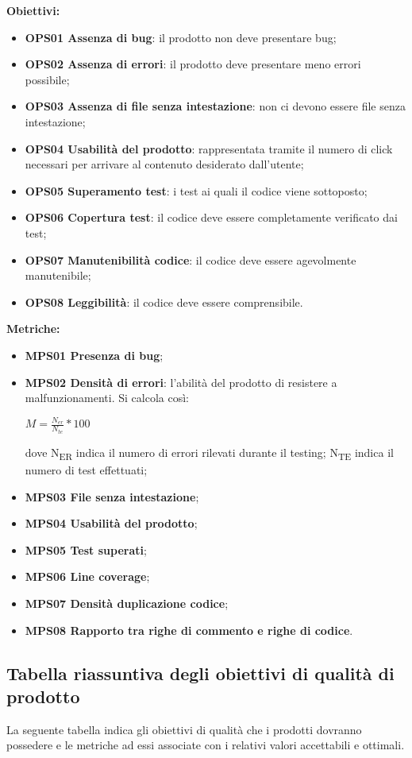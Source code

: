 \documentclass[../piano_di_qualifica.tex]{subfiles}
\begin{document}
\smallbreak
\textbf{Obiettivi:}
\smallbreak
\begin{itemize}
	\item \textbf{OPS01 Assenza di bug}: il prodotto non deve presentare bug;
	\item \textbf{OPS02 Assenza di errori}: il prodotto deve presentare meno errori possibile;
	\item \textbf{OPS03 Assenza di file senza intestazione}: non ci devono essere file senza intestazione;
	\item \textbf{OPS04 Usabilità del prodotto}: rappresentata tramite il numero di click necessari per arrivare al contenuto desiderato dall'utente;
	\item \textbf{OPS05 Superamento test}: i test ai quali il codice viene sottoposto;
	\item \textbf{OPS06 Copertura test}: il codice deve essere completamente verificato dai test;
	\item \textbf{OPS07 Manutenibilità codice}: il codice deve essere agevolmente manutenibile;
	\item \textbf{OPS08 Leggibilità}: il codice deve essere comprensibile.
\end{itemize}

\textbf{Metriche:}
\smallbreak
\begin{itemize}
	\item \textbf{MPS01 Presenza di bug};
	\item \textbf{MPS02 Densità di errori}: l'abilità del prodotto di resistere a malfunzionamenti. Si calcola così: 
	\begin{center} $M = \frac{N_{er}}{N_{te}} * 100$ \end{center}
	dove
	\subitem N\textsubscript{ER} indica il numero di errori rilevati durante il testing;
	\subitem N\textsubscript{TE} indica il numero di test effettuati;
	\item \textbf{MPS03 File senza intestazione};
	\item \textbf{MPS04 Usabilità del prodotto};
	\item \textbf{MPS05 Test superati};
	\item \textbf{MPS06 Line coverage};
	\item \textbf{MPS07 Densità duplicazione codice};
	\item \textbf{MPS08 Rapporto tra righe di commento e righe di codice}.
\end{itemize}

\subsection{Tabella riassuntiva degli obiettivi di qualità di prodotto}
La seguente tabella indica gli obiettivi di qualità che i prodotti dovranno possedere e le metriche ad essi associate con i relativi valori accettabili e ottimali. \\
\end{document}
